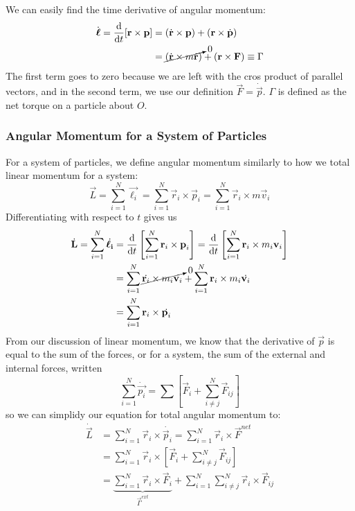 \documentclass[a4paper]{article}
\begin{document}
We can easily find the time derivative of angular momentum:
\begin{align*}
    \dot{\boldsymbol{\mathbf{\ell}}} = \frac{\mathrm{d}}{\mathrm{d} t}[\boldsymbol{\mathbf{r}}\times\boldsymbol{\mathbf{p}}] &=
        (\dot{\boldsymbol{\mathbf{r}}}\times\boldsymbol{\mathbf{p}}) + (\boldsymbol{\mathbf{r}}\times\dot{\boldsymbol{\mathbf{p}}})\\
&= \cancelto{0}{(\dot{\boldsymbol{\mathbf{r}}}\times m\dot{\boldsymbol{\mathbf{r}}})}
    + (\boldsymbol{\mathbf{r}}\times\boldsymbol{\mathbf{F}}) \equiv \Gamma
\end{align*}
The first term goes to zero because we are left with the cros product of
parallel vectors, and in the second term, we use our definition
$\vec{F} = \dot{\vec{p}}$. $\Gamma$ is defined as the net torque on a particle
about $O$.

\subsubsection{Angular Momentum for a System of Particles}
For a system of particles, we define angular momentum similarly to how we
total linear momentum for a system:
\[
    \vec{L} = \sum_{i=1}^{N} \vec{\ell_i} =
        \sum_{i=1}^{N} \vec{r}_i\times\vec{p}_i =
        \sum_{i=1}^{N} \vec{r}_i\times m\vec{v}_i
\]
Differentiating with respect to $t$ gives us
\begin{align*}
    \dot{\boldsymbol{\mathbf{L}}}=\sum_{i=1}^{N}\dot{\boldsymbol{\mathbf{\ell_i}}}&=
    \frac{\mathrm{d}}{\mathrm{d} t}\left[\sum_{i=1}^{N}\boldsymbol{\mathbf{r}}_i\times\boldsymbol{\mathbf{p}}_i\right]
    =\frac{\mathrm{d}}{\mathrm{d} t}\left[\sum_{i=1}^{N}\boldsymbol{\mathbf{r}}_i\times m_i\boldsymbol{\mathbf{v}}_i\right]\\
    &= \sum_{i=1}^{N} \cancelto{0}{\dot{\boldsymbol{\mathbf{r}}_i}\times m_i\boldsymbol{\mathbf{v}}_i} +
        \sum_{i=1}^{N} \boldsymbol{\mathbf{r}}_i\times m_i\dot{\boldsymbol{\mathbf{v}}_i}\\
    &= \sum_{i=1}^{N} \boldsymbol{\mathbf{r}}_i\times \dot{\boldsymbol{\mathbf{p}}_i}
\end{align*}
From our discussion of linear momentum, we know that the derivative of $\vec{p}$
is equal to the sum of the forces, or for a system, the sum of the external and
internal forces, written
\[
    \sum_{i=1}^{N} \dot{\vec{p_i}} = \sum\left[\vec{F}_{i}+\sum_{i\neq j}^{N}
        \vec{F}_{ij}\right]
\]
so we can simplidy our equation for total angular momentum to:
\begin{align*}
    \dot{\vec{L}} &= \sum_{i=1}^N \vec{r}_i\times\dot{\vec{p}_i}
        = \sum_{i=1}^N \vec{r}_i\times\vec{F}^{net}\\
        &= \sum_{i=1}^N \vec{r}_i\times\left[\vec{F}_{i}+\sum_{i\neq j}^{N}
        \vec{F}_{ij}\right]\\
        &= \underbrace{\sum_{i=1}^N \vec{r}_i\times\vec{F}_i}_{\vec{\Gamma}^{ext}} +
            \sum_{i=1}^N \sum_{i\neq j}^N \vec{r}_i\times\vec{F}_{ij}
\end{align*}
\end{document}
